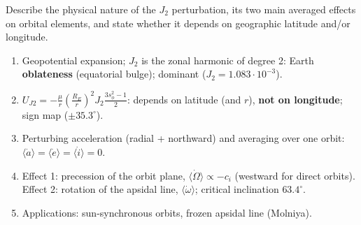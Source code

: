 \begin{qbox}
Describe the physical nature of the $J_2$ perturbation, its two main averaged effects on orbital elements, and state whether it
depends on geographic latitude and/or longitude.
\end{qbox}

\begin{outline}
\begin{enumerate}
\item Geopotential expansion; $J_2$ is the zonal harmonic of degree 2: Earth \textbf{oblateness} (equatorial bulge); dominant ($J_2=1.083\cdot10^{-3}$).
\item $U_{J2}=-\frac{\mu}{r}\left(\frac{R_E}{r}\right)^2J_2\frac{3s_\phi^2-1}{2}$: depends on latitude (and $r$), \textbf{not on longitude}; sign map ($\pm35.3^\circ$).
\item Perturbing acceleration (radial + northward) and averaging over one orbit: $\langle\dot a\rangle=\langle\dot e\rangle=\langle\dot i\rangle=0$.
\item Effect 1: precession of the orbit plane, $\langle\dot\Omega\rangle\propto-c_i$ (westward for direct orbits). Effect 2: rotation of the apsidal line, $\langle\dot\omega\rangle$; critical inclination $63.4^\circ$.
\item Applications: sun-synchronous orbits, frozen apsidal line (Molniya).
\end{enumerate}
\end{outline}

\answer

